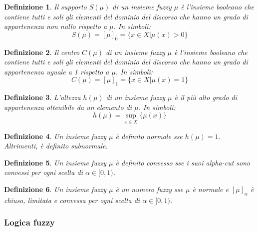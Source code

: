 \documentclass[10pt,a4paper]{article}
\newtheorem{definition}{Definizione}
\begin{document}
\begin{definition}
Il \emph{supporto} $S(\mu)$ di un insieme fuzzy $\mu$ è l'insieme booleano che contiene tutti e soli gli elementi del dominio del discorso che hanno un grado di appartenenza non nullo rispetto a $\mu$. In simboli:
$$
S(\mu) = [\mu]_{\bar{0}} = \{ x \in X | \mu(x) > 0 \}
$$
\end{definition}

\begin{definition}
Il \emph{centro} $C(\mu)$ di un insieme fuzzy $\mu$ è l'insieme booleano che contiene tutti e soli gli elementi del dominio del discorso che hanno un grado di appartenenza uguale a 1 rispetto a $\mu$. In simboli:
$$
C(\mu) = [\mu]_{1} = \{ x \in X | \mu(x) = 1 \}
$$
\end{definition}

\begin{definition}
L'\emph{altezza} $h(\mu)$ di un insieme fuzzy $\mu$ è il più alto grado di appartenenza ottenibile da un elemento di $\mu$. In simboli:
$$
h(\mu) = \sup_{x \in X} \{\mu(x)\}
$$
\end{definition}

\begin{definition}
Un insieme fuzzy $\mu$ è definito \emph{normale} sse $h(\mu) = 1$. Altrimenti, è definito \emph{subnormale}.
\end{definition}

\begin{definition}
Un insieme fuzzy $\mu$ è definito \emph{convesso} sse i suoi alpha-cut sono convessi per ogni scelta di $\alpha \in [0,1)$.
\end{definition}

\begin{definition}
Un insieme fuzzy $\mu$ è un \emph{numero fuzzy} sse $\mu$ è normale e $[\mu]_\alpha$ è chiusa, limitata e convessa per ogni scelta di $\alpha \in [0,1)$.
\end{definition}

\subsubsection{Logica fuzzy}
\end{document}
